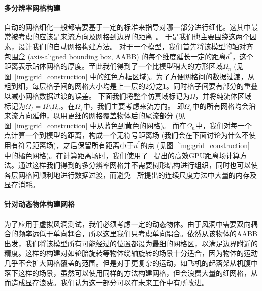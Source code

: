 \paragraph{多分辨率网格构建}
自动的网格细化一般都需要基于一定的标准来指导对哪一部分进行细化。这其中最常被考虑的应该是来流方向及网格到边界的距离~\citep{Sandoval-2012,Li-2019}。
于是我们也主要围绕这两个因素，设计我们的自动网格构建方法。
对于一个模型，我们首先将该模型的轴对齐包围盒 (axis-aligned bounding box, AABB) 的每个维度延长一定的距离$d^*$，这个距离表示贴体网格的厚度。至此我们得到了一个比模型稍大的方形区域$\Omega_n$ (见图~\ref{img:grid_construction} 中的红色方框区域)。为了方便网格间的数据过渡，从粗到细，每层格子间的网格大小均是上一层的2分之1。同时格子间要有部分的重叠以减小网格数据过渡的误差。
下面我们将整个仿真域标记为$\Omega$，并将纯流体区域标记为$\Omega_f \!=\! \Omega \setminus \Omega_n$。在$\Omega_f$中，我们主要考虑来流方向。
即$\Omega_f$中的所有网格均会沿来流方向延伸，以用更细的网格覆盖物体后的尾流部分 (见图~\ref{img:grid_construction} 中从蓝色到黄色的网格)。
而在$\Omega_n$中，我们对每一个点计算一个到模型的距离，构成一个无符号距离场 (我们会在下面讨论为什么不使用有符号距离场)，之后保留所有距离小于$d^*$的点 (见图~\ref{img:grid_construction} 中的橘色网格)。在计算距离场时，我们使用了~\citet{Imre-2017} 提出的高效GPU距离场计算方法。通过这样我们得到的多分辨率网格并不需要树形结构进行组织，同时也可以使各层网格间顺利地进行数据过渡，而避免~\citet{Li-2019} 所提出的连续尺度方法中大量的内存及显存消耗。

\paragraph{针对动态物体构建网格}
为了应用于虚拟风洞测试，我们必须考虑一定的动态物体。由于风洞中需要双向耦合的频率远低于单向耦合，所以这里我们只考虑单向耦合。依然从该物体的AABB出发，我们将该模型所有可能经过的位置都设为最细的网格区，以满足边界附近的精度。这样的构建对如轮胎旋转等物体绕轴旋转的场景十分适合，因为物体的运动几乎不会扩大网格覆盖的范围。但是对于更复杂的运动，如飞机的起落架从机腹中落下这样的场景，虽然可以使用同样的方法构建网格，但会浪费大量的细网格，从而造成显存浪费。我们认为这一部分可以在未来工作中有所改进。

